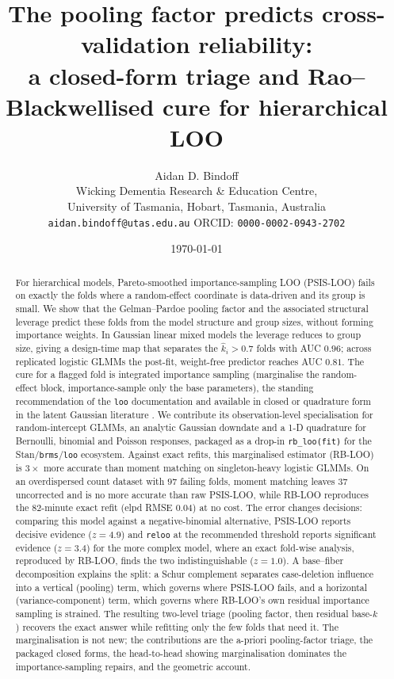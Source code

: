 \documentclass[11pt]{article}
\title{\bf The pooling factor predicts cross-validation reliability:\\
a closed-form triage and Rao--Blackwellised cure for hierarchical LOO}
\author{Aidan D. Bindoff\\[2pt]
Wicking Dementia Research \& Education Centre,\\
University of Tasmania, Hobart, Tasmania, Australia\\[2pt]
\small \texttt{aidan.bindoff@utas.edu.au} \quad ORCID: \texttt{0000-0002-0943-2702}}
\date{\today}
\newcommand{\khat}{\hat{k}}
\begin{document}
\maketitle

\begin{abstract}
For hierarchical models, Pareto-smoothed importance-sampling LOO (PSIS-LOO) fails on
exactly the folds where a random-effect coordinate is data-driven and its group is
small. We show that the Gelman--Pardoe pooling factor and the associated structural
leverage predict these folds from the model structure and group sizes, without
forming importance weights. In Gaussian linear mixed models the leverage reduces to
group size, giving a design-time map that separates the $\khat_i>0.7$ folds with AUC
$0.96$; across replicated logistic GLMMs the post-fit, weight-free predictor reaches
AUC $0.81$. The cure for a flagged fold is integrated importance sampling
(marginalise the random-effect block, importance-sample only the base parameters),
the standing recommendation of the \texttt{loo} documentation and available in closed
or quadrature form in the latent Gaussian literature \citep{vehtari2016glvm,
merkle2019bayesian, burkner2021efficient}. We contribute its observation-level
specialisation for random-intercept GLMMs, an analytic Gaussian downdate and a 1-D
quadrature for Bernoulli, binomial and Poisson responses, packaged as a drop-in
\texttt{rb\_loo(fit)} for the Stan/\texttt{brms}/\texttt{loo} ecosystem. Against exact
refits, this marginalised estimator (RB-LOO) is $3\times$ more accurate than moment
matching on singleton-heavy logistic GLMMs. On an overdispersed count dataset with
$97$ failing folds, moment matching leaves $37$ uncorrected and is no more accurate
than raw PSIS-LOO, while RB-LOO reproduces the $82$-minute exact refit (elpd RMSE
$0.04$) at no cost. The error changes decisions: comparing this model against a
negative-binomial alternative, PSIS-LOO reports decisive evidence ($z=4.9$) and
\texttt{reloo} at the recommended threshold reports significant evidence ($z=3.4$)
for the more complex model, where an exact fold-wise analysis, reproduced by RB-LOO,
finds the two indistinguishable ($z=1.0$). A base--fiber decomposition explains the
split: a Schur complement separates case-deletion influence into a vertical (pooling)
term, which governs where PSIS-LOO fails, and a horizontal (variance-component) term,
which governs where RB-LOO's own residual importance sampling is strained. The
resulting two-level triage (pooling factor, then residual base-$\khat$) recovers the
exact answer while refitting only the few folds that need it. The marginalisation is
not new; the contributions are the a-priori pooling-factor triage, the packaged
closed forms, the head-to-head showing marginalisation dominates the
importance-sampling repairs, and the geometric account.
\end{abstract}
\end{document}
